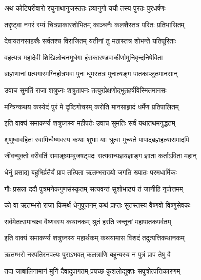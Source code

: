 \twolineshloka
{अथ कोटिपरीवारो रघुनाथानुजस्ततः}
{हयानुगो ययौ तस्य पुरतः पुरधर्षणः}%

\twolineshloka
{तद्दृष्ट्वा नगरं रम्यं चित्रप्राकारशोभितम्}
{काञ्चनैः कलशैस्तत्र परितः प्रतिभासितम्}%

\twolineshloka
{देवायतनसाहस्रैः सर्वतश्च विराजितम्}
{यतीनां तु मठास्तत्र शोभन्ते यतिपूरिताः}%

\twolineshloka
{वहत्यत्र महादेवी शिखिलोचनमूर्धगा}
{हंसकारण्डवाकीर्णामुनिवृन्दनिषेविता}%

\twolineshloka
{ब्राह्मणानां प्रत्यगारमग्निहोत्रभवः पुनः}
{धूमस्तत्र पुनात्यङ्ग पातकाप्लुतमानसान्}%

\twolineshloka
{उवाच सुमतिं राजा शत्रुघ्नः शत्रुतापनः}
{तत्पुरप्रेक्षणोद्भूतहर्षविस्मितमानसः}%


\twolineshloka
{मन्त्रिन्कथय कस्येदं पुरं मे दृष्टिगोचरम्}
{करोति मानसाह्लादं धर्मेण प्रतिपालितम्}%


\twolineshloka
{इति वाक्यं समाकर्ण्य शत्रुघ्नस्य महीपतेः}
{उवाच सुमतिः सर्वं यथातथमनुद्धतम्}%


\twolineshloka
{शृणुष्वावहितः स्वामिन्वैष्णवस्य कथाः शुभाः}
{याः श्रुत्वा मुच्यते पापाद्ब्रह्महत्यासमादपि}%

\twolineshloka
{जीवन्मुक्तो वरीवर्ति रामाङ्घ्र्यम्बुजषट्पदः}
{सत्यवान्यज्ञयज्ञाङ्ग ज्ञाता कर्ताऽविता महान्}%

\twolineshloka
{धेनुं प्रसाद्य बहुभिर्व्रतैर्यं प्राप तत्पिता}
{ऋतम्भराख्यो जगति ख्यातः परमधार्मिकः}%

\twolineshloka
{गौः प्रसन्ना ददौ पुत्रमनेकगुणसंस्कृतम्}
{सत्यवन्तं सुशोभाढ्यं तं जानीहि नृपोत्तमम्}%


\twolineshloka
{को वा ऋतम्भरो राजा किमर्थं धेनुपूजनम्}
{कथं प्राप्तः सुतस्तस्य वैष्णवो विष्णुसेवकः}%

\twolineshloka
{सर्वमेतत्समाचक्ष्व वैष्णवस्य कथानकम्}
{श्रुतं हरति जन्तूनां महापातकपर्वतम्}%


\twolineshloka
{इति वाक्यं समाकर्ण्य शत्रुघ्नस्य महार्थकम्}
{कथयामास विशदं तदुत्पत्तिकथानकम्}%

\twolineshloka
{ऋतम्भरो नरपतिरनपत्यः पुराऽभवत्}
{कलत्राणि बहून्यस्य न पुत्रं प्राप तेषु वै}%

\twolineshloka
{तदा जाबालिनामानं मुनिं दैवादुपागतम्}
{प्रपच्छ कुशलोद्युक्तः सपुत्रोत्पत्तिकारणम्}%

